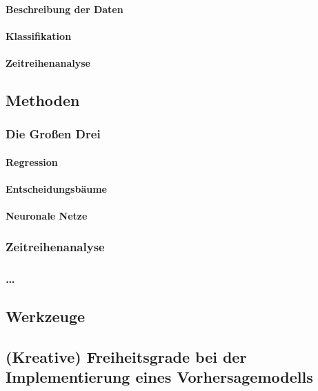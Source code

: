 \paragraph{Beschreibung der Daten}

\paragraph{Klassifikation}

\paragraph{Zeitreihenanalyse}

\subsection{Methoden}

\subsubsection{Die Großen Drei}

\paragraph{Regression}

\paragraph{Entscheidungsbäume}

\paragraph{Neuronale Netze}

\subsubsection{Zeitreihenanalyse}

\subsubsection{\ldots}

\subsection{Werkzeuge}

\subsection{(Kreative) Freiheitsgrade bei der Implementierung eines
  Vorhersagemodells}

